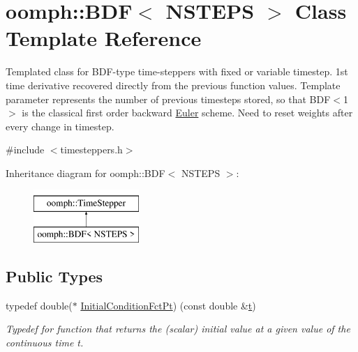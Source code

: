 \hypertarget{classoomph_1_1BDF}{}\section{oomph\+:\+:B\+DF$<$ N\+S\+T\+E\+PS $>$ Class Template Reference}
\label{classoomph_1_1BDF}


Templated class for B\+D\+F-\/type time-\/steppers with fixed or variable timestep. 1st time derivative recovered directly from the previous function values. Template parameter represents the number of previous timesteps stored, so that B\+D\+F$<$1$>$ is the classical first order backward \hyperlink{classoomph_1_1Euler}{Euler} scheme. Need to reset weights after every change in timestep.  




{\ttfamily \#include $<$timesteppers.\+h$>$}

Inheritance diagram for oomph\+:\+:B\+DF$<$ N\+S\+T\+E\+PS $>$\+:\begin{figure}[H]
\begin{center}
\leavevmode
\includegraphics[height=2.000000cm]{classoomph_1_1BDF}
\end{center}
\end{figure}
\subsection*{Public Types}
\begin{DoxyCompactItemize}
\item 
typedef double($\ast$ \hyperlink{classoomph_1_1BDF_a7b4271c53928ee107dc9b5ab218bfe74}{Initial\+Condition\+Fct\+Pt}) (const double \&\hyperlink{cfortran_8h_af6f0bd3dc13317f895c91323c25c2b8f}{t})
\begin{DoxyCompactList}\small\item\em Typedef for function that returns the (scalar) initial value at a given value of the continuous time t. \end{DoxyCompactList}\end{DoxyCompactItemize}
